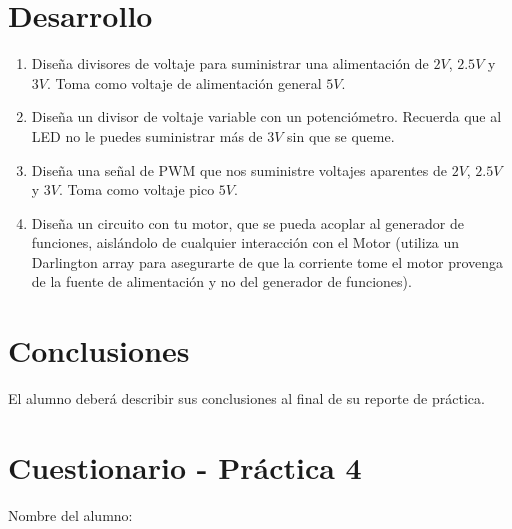 
\section{Desarrollo}

	\begin{enumerate}
		\item Diseña divisores de voltaje para suministrar una alimentación de $2 V$, $2.5 V$ y $3 V$. Toma como voltaje de alimentación general $5 V$.
		\item Diseña un divisor de voltaje variable con un potenciómetro. Recuerda que al LED no le puedes suministrar más de $3 V$ sin que se queme.
		\item Diseña una señal de PWM que nos suministre voltajes aparentes de $2 V$, $2.5 V$ y $3 V$. Toma como voltaje pico $5 V$.
		\item Diseña un circuito con tu motor, que se pueda acoplar al generador de funciones, aislándolo de cualquier interacción con el Motor (utiliza un Darlington array para asegurarte de que la corriente tome el motor provenga de la fuente de alimentación y no del generador de funciones).
	\end{enumerate}



\section{Conclusiones}

	El alumno deberá describir sus conclusiones al final de su reporte de práctica.


\clearpage
\section{Cuestionario - Práctica 4}
	Nombre del alumno: \\[0.2cm]
	\horrule{0.5pt} \\[0.2cm] %

